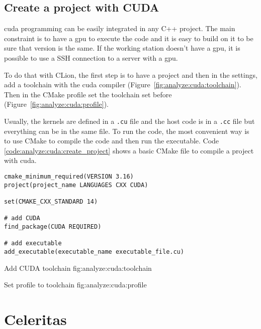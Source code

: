 \subsection{Create a project with CUDA}
\label{ch:analyze:cuda:create_project}

\acrshort{cuda} programming can be easily integrated in any C++ project.
The main constraint is to have a \acrshort{gpu} to execute the code and it is
easy to build on it to be sure that version is the same.
If the working station doesn't have a \acrshort{gpu}, it is possible to use a
SSH connection to a server with a \acrshort{gpu}.

To do that with CLion, the first step is to have a project and then in the
settings, add a toolchain with the \acrshort{cuda} compiler (Figure~\ref{fig:analyze:cuda:toolchain}).
Then in the CMake profile set the toolchain set before (Figure~\ref{fig:analyze:cuda:profile}).

Usually, the kernels are defined in a \texttt{.cu} file and the host code is in
a \texttt{.cc} file but everything can be in the same file.
To run the code, the most convenient way is to use CMake to compile the code
and then run the executable.
Code \ref{code:analyze:cuda:create_project} shows a basic CMake file to
compile a project with \acrshort{cuda}.

\begin{code}
    \label{code:analyze:cuda:create_project}
    \begin{verbatim}
cmake_minimum_required(VERSION 3.16)
project(project_name LANGUAGES CXX CUDA)

set(CMAKE_CXX_STANDARD 14)

# add CUDA
find_package(CUDA REQUIRED)

# add executable
add_executable(executable_name executable_file.cu)
    \end{verbatim}
\end{code}

{Add CUDA toolchain}
{fig:analyze:cuda:toolchain}

{Set profile to toolchain}
{fig:analyze:cuda:profile}



\section{Celeritas}
\label{ch:analyze:atlas}

